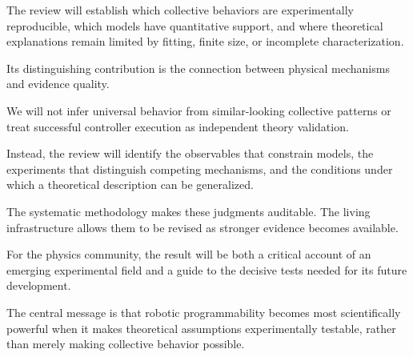 The review will establish which
collective behaviors are experimentally
reproducible, which models have
quantitative support, and where
theoretical explanations remain
limited by fitting, finite size,
or incomplete characterization.

Its distinguishing contribution
is the connection between
physical mechanisms and
evidence quality.

We will not infer universal
behavior from similar-looking
collective patterns or treat
successful controller execution
as independent theory validation.

Instead, the review will
identify the observables
that constrain models,
the experiments that
distinguish competing
mechanisms, and the
conditions under which
a theoretical description
can be generalized.

The systematic methodology
makes these judgments
auditable. The living
infrastructure allows
them to be revised
as stronger evidence
becomes available.

For the physics community,
the result will be both
a critical account of
an emerging experimental
field and a guide to
the decisive tests
needed for its future
development.

The central message
is that robotic
programmability becomes
most scientifically
powerful when it
makes theoretical
assumptions experimentally
testable, rather than
merely making collective
behavior possible.